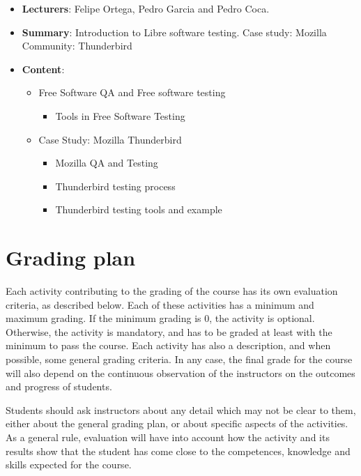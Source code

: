 \documentclass[a4paper]{article}
\begin{document}
\begin{itemize}
 \item \textbf{Lecturers}: Felipe Ortega, Pedro Garcia and Pedro Coca.
 \item \textbf{Summary}: Introduction to Libre software testing. Case study: Mozilla Community: Thunderbird
 \item \textbf{Content}:

    \begin{itemize}

     \item Free Software QA and Free software testing

      \begin{itemize}
       \item Tools in Free Software Testing
      \end{itemize}

     \item Case Study: Mozilla Thunderbird

        \begin{itemize}
         \item Mozilla QA and Testing
         \item Thunderbird testing process
         \item Thunderbird testing tools and example
        \end{itemize}

    \end{itemize}
   

\end{itemize}

\section{Grading plan}

Each activity contributing to the grading of the course has its own evaluation criteria, as described below. Each of these activities has a minimum and maximum grading. If the minimum grading is 0, the activity is optional. Otherwise, the activity is mandatory, and has to be graded at least with the minimum to pass the course. Each activity has also a description, and when possible, some general grading criteria. In any case, the final grade for the course will also depend on the continuous observation of the instructors on the outcomes and progress of students.

Students should ask instructors about any detail which may not be clear to them, either about the general grading plan, or about specific aspects of the activities. As a general rule, evaluation will have into account how the activity and its results show that the student has come close to the competences, knowledge and skills expected for the course.
\end{document}
